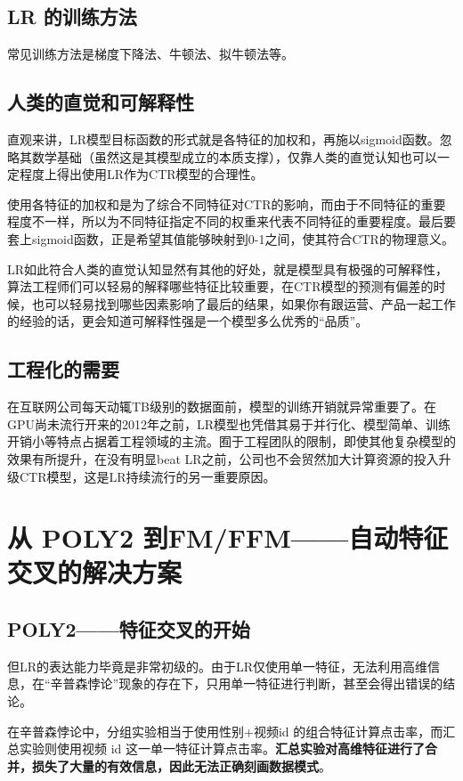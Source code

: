 \documentclass[12pt]{article}
\begin{document}
\subsection{LR 的训练方法}
常见训练方法是梯度下降法、牛顿法、拟牛顿法等。

\subsection{人类的直觉和可解释性}
直观来讲，LR模型目标函数的形式就是各特征的加权和，再施以sigmoid函数。忽略其数学基础（虽然这是其模型成立的本质支撑），仅靠人类的直觉认知也可以一定程度上得出使用LR作为CTR模型的合理性。

使用各特征的加权和是为了综合不同特征对CTR的影响，而由于不同特征的重要程度不一样，所以为不同特征指定不同的权重来代表不同特征的重要程度。最后要套上sigmoid函数，正是希望其值能够映射到0-1之间，使其符合CTR的物理意义。

LR如此符合人类的直觉认知显然有其他的好处，就是模型具有极强的可解释性，算法工程师们可以轻易的解释哪些特征比较重要，在CTR模型的预测有偏差的时候，也可以轻易找到哪些因素影响了最后的结果，如果你有跟运营、产品一起工作的经验的话，更会知道可解释性强是一个模型多么优秀的“品质”。

\subsection{工程化的需要}
在互联网公司每天动辄TB级别的数据面前，模型的训练开销就异常重要了。在GPU尚未流行开来的2012年之前，LR模型也凭借其易于并行化、模型简单、训练开销小等特点占据着工程领域的主流。囿于工程团队的限制，即使其他复杂模型的效果有所提升，在没有明显beat LR之前，公司也不会贸然加大计算资源的投入升级CTR模型，这是LR持续流行的另一重要原因。

\section{从 POLY2 到FM/FFM——自动特征交叉的解决方案}
\subsection{POLY2——特征交叉的开始}
但LR的表达能力毕竟是非常初级的。由于LR仅使用单一特征，无法利用高维信息，在“辛普森悖论”现象的存在下，只用单一特征进行判断，甚至会得出错误的结论。

在辛普森悖论中，分组实验相当于使用性别+视频id 的组合特征计算点击率，而汇总实验则使用视频 id 这一单一特征计算点击率。\textbf{汇总实验对高维特征进行了合并，损失了大量的有效信息，因此无法正确刻画数据模式}。
\end{document}
